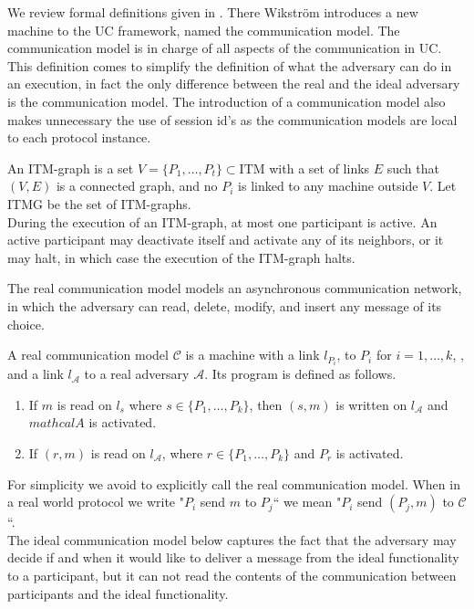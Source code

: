 \documentclass{acm_proc_article-sp}
\begin{document}

We review formal definitions given in \cite{mnCompleto}. There Wikstr\"om introduces
a new machine to the UC framework, named the communication model.
The communication model is in charge of all aspects of the
communication in UC. This definition comes to simplify the definition of what the
adversary can do in an execution, in fact the only difference between the real and the ideal
adversary is the communication model. The introduction of a communication model
also makes unnecessary the use of session id's as the communication models are local to each protocol instance.


\begin{definition}
An ITM-graph is a set $V = \{P_1, \ldots, P_t\} \subset \textrm{ITM}$ with a set of
links $E$ such that $(V, E)$ is a connected graph, and no $P_i$ is linked to any
machine outside $V$. Let ITMG be the set of ITM-graphs.\\
During the execution of an ITM-graph, at most one participant is active. An active
participant may deactivate itself and activate any of its neighbors, or it may halt, in
which case the execution of the ITM-graph halts.
\end{definition}

The real communication model models an asynchronous communication network, in which the
adversary can read, delete, modify, and insert any message of its choice. 

\begin{definition}
A real communication model $\mathcal{C}$ is a machine with a link $l_{P_i}$, to $P_i$
for $i = 1, \ldots, k$, , and a link $l_\mathcal{A}$ to a real adversary $\mathcal{A}$.
Its program is defined as follows.
\begin{enumerate}
  \item If $m$ is read on $l_s$ where $s \in \{P_1, \ldots, P_k\}$, then $(s, m)$ is
        written on $l_\mathcal{A}$ and $mathcal{A}$ is activated.
  \item If $(r, m)$ is read on $l_\mathcal{A}$, where $r \in \{P_1, \ldots, P_k\}$
        and $P_r$ is activated.
\end{enumerate}
\end{definition}

For simplicity
we avoid to explicitly call the real communication model. When in a real world
protocol we write "$P_i$ send $m$ to $P_j$`` we mean "$P_i$ send $(P_j,m)$ to
$\mathcal{C}$``.\\
The ideal communication model below captures the fact that the adversary may decide if
and when it would like to deliver a message from the ideal functionality to a
participant, but it can not read the contents of the communication between participants
and the ideal functionality.
\end{document}
